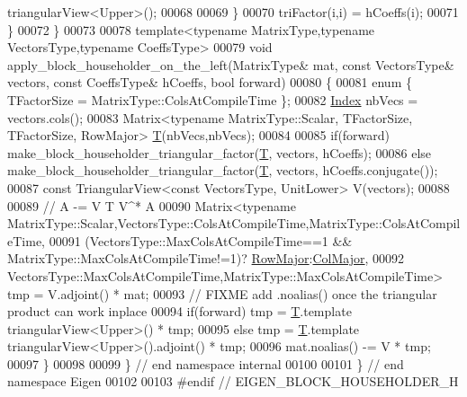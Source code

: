 \begin{DoxyCode}
      triangularView<Upper>();
00068       
00069     \}
00070     triFactor(i,i) = hCoeffs(i);
00071   \}
00072 \}
00073 
00078 \textcolor{keyword}{template}<\textcolor{keyword}{typename} MatrixType,\textcolor{keyword}{typename} VectorsType,\textcolor{keyword}{typename} CoeffsType>
00079 \textcolor{keywordtype}{void} apply\_block\_householder\_on\_the\_left(MatrixType& mat, \textcolor{keyword}{const} VectorsType& vectors, \textcolor{keyword}{const} CoeffsType& 
      hCoeffs, \textcolor{keywordtype}{bool} forward)
00080 \{
00081   \textcolor{keyword}{enum} \{ TFactorSize = MatrixType::ColsAtCompileTime \};
00082   \hyperlink{namespace_eigen_a62e77e0933482dafde8fe197d9a2cfde}{Index} nbVecs = vectors.cols();
00083   Matrix<typename MatrixType::Scalar, TFactorSize, TFactorSize, RowMajor> \hyperlink{group___sparse_core___module_class_eigen_1_1_triplet}{T}(nbVecs,nbVecs);
00084   
00085   \textcolor{keywordflow}{if}(forward) make\_block\_householder\_triangular\_factor(\hyperlink{group___sparse_core___module_class_eigen_1_1_triplet}{T}, vectors, hCoeffs);
00086   \textcolor{keywordflow}{else}        make\_block\_householder\_triangular\_factor(\hyperlink{group___sparse_core___module_class_eigen_1_1_triplet}{T}, vectors, hCoeffs.conjugate());  
00087   \textcolor{keyword}{const} TriangularView<const VectorsType, UnitLower> V(vectors);
00088 
00089   \textcolor{comment}{// A -= V T V^* A}
00090   Matrix<\textcolor{keyword}{typename} MatrixType::Scalar,VectorsType::ColsAtCompileTime,MatrixType::ColsAtCompileTime,
00091          (VectorsType::MaxColsAtCompileTime==1 && MatrixType::MaxColsAtCompileTime!=1)?
      \hyperlink{group__enums_ggaacded1a18ae58b0f554751f6cdf9eb13acfcde9cd8677c5f7caf6bd603666aae3}{RowMajor}:\hyperlink{group__enums_ggaacded1a18ae58b0f554751f6cdf9eb13a0cbd4bdd0abcfc0224c5fcb5e4f6669a}{ColMajor},
00092          VectorsType::MaxColsAtCompileTime,MatrixType::MaxColsAtCompileTime> tmp = V.adjoint() * mat;
00093   \textcolor{comment}{// FIXME add .noalias() once the triangular product can work inplace}
00094   \textcolor{keywordflow}{if}(forward) tmp = \hyperlink{group___sparse_core___module_class_eigen_1_1_triplet}{T}.template triangularView<Upper>()           * tmp;
00095   \textcolor{keywordflow}{else}        tmp = \hyperlink{group___sparse_core___module_class_eigen_1_1_triplet}{T}.template triangularView<Upper>().adjoint() * tmp;
00096   mat.noalias() -= V * tmp;
00097 \}
00098 
00099 \} \textcolor{comment}{// end namespace internal}
00100 
00101 \} \textcolor{comment}{// end namespace Eigen}
00102 
00103 \textcolor{preprocessor}{#endif // EIGEN\_BLOCK\_HOUSEHOLDER\_H}
\end{DoxyCode}
